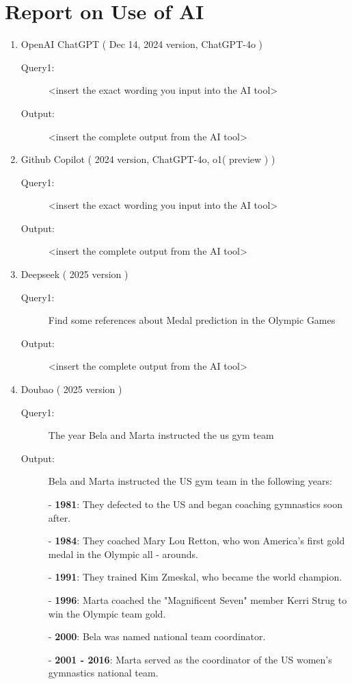 \setcounter{lastpage}{\value{page}}
\thispagestyle{empty} 

\section*{Report on Use of AI}

\begin{enumerate}
\item OpenAI ChatGPT ( Dec 14, 2024 version, ChatGPT-4o ) 
\begin{description}
\item[Query1:] <insert the exact wording you input into the AI tool> 
\item[Output:] <insert the complete output from the AI tool>
\end{description}
\item Github Copilot ( 2024 version, ChatGPT-4o, o1( preview ) ) 
\begin{description}
\item[Query1:] <insert the exact wording you input into the AI tool> 
\item[Output:] <insert the complete output from the AI tool>
\end{description}

\item Deepseek ( 2025 version )
\begin{description}
    \item[Query1:] Find some references about Medal prediction in the Olympic Games 
    \item[Output:] <insert the complete output from the AI tool>
    \end{description}

\item Doubao ( 2025 version ) 
\begin{description}
\item[Query1:] The year Bela and Marta instructed the us gym team 
\item[Output:] Bela and Marta instructed the US gym team in the following years:

- \textbf{1981}: They defected to the US and began coaching gymnastics soon after.

- \textbf{1984}: They coached Mary Lou Retton, who won America's first gold medal in the Olympic all - arounds.

- \textbf{1991}: They trained Kim Zmeskal, who became the world champion.

- \textbf{1996}: Marta coached the "Magnificent Seven" member Kerri Strug to win the Olympic team gold.

- \textbf{2000}: Bela was named national team coordinator.

- \textbf{2001 - 2016}: Marta served as the coordinator of the US women's gymnastics national team.

\end{description}
\end{enumerate}
